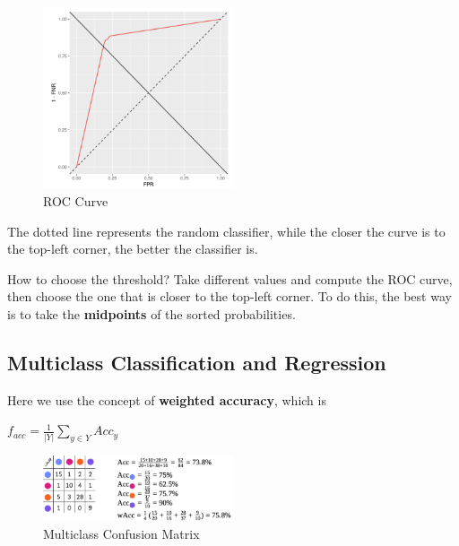 
\begin{center}
    \begin{figure}[H]
        \centering
        \includegraphics[width=0.5\textwidth]{assets/fig8.png}
        \caption{ROC Curve}
    \end{figure}
\end{center}

The dotted line represents the random classifier, while the closer the curve is to the top-left corner, the better the classifier is.

How to choose the threshold? Take different values and compute the ROC curve, then choose the one that is closer to the top-left corner. To do this, the best way is to take the \textbf{midpoints} of the sorted probabilities.

\newpage 

\subsection{Multiclass Classification and Regression}

Here we use the concept of \textbf{weighted accuracy}, which is 
    
    $f_{acc} = \frac{1}{|Y|}\sum_{y \in Y}^{}Acc_y$

\begin{figure}[H]
    \centering
    \includegraphics[width=0.5\textwidth]{assets/fig9.png}
    \caption{Multiclass Confusion Matrix}
\end{figure}

